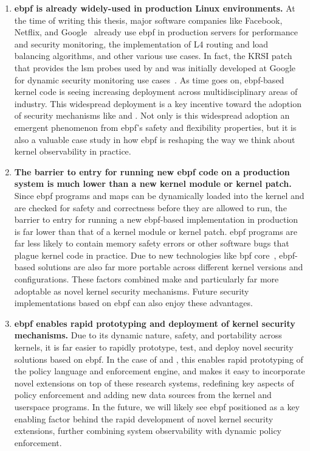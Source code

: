 \begin{enumerate}
  \item \textbf{\gls{ebpf} is already widely-used in production Linux environments.} At
  the time of writing this thesis, major software companies like Facebook, Netflix, and
  Google~\cite{gregg2019_bpf} already use \gls{ebpf} in production servers for performance
  and security monitoring, the implementation of L4 routing and load balancing algorithms,
  and other various use cases. In fact, the KRSI patch that provides the \gls{lsm} probes
  used by \bpfbox{} and \bpfcontain{} was initially developed at Google for dynamic
  security monitoring use cases~\cite{singh2019_krsi}. As time goes on, \gls{ebpf}-based
  kernel code is seeing increasing deployment across multidisciplinary areas of industry.
  This widespread deployment is a key incentive toward the adoption of security mechanisms
  like \bpfbox{} and \bpfcontain{}. Not only is this widespread adoption an emergent
  phenomenon from \gls{ebpf}'s safety and flexibility properties, but it is also
  a valuable case study in how \gls{ebpf} is reshaping the way we think about kernel
  observability in practice.

  \item \textbf{The barrier to entry for running new \gls{ebpf} code on a production
  system is much lower than a new kernel module or kernel patch.}
  Since \gls{ebpf} programs and maps can be dynamically loaded into the kernel and are
  checked for safety and correctness before they are allowed to run, the barrier to entry
  for running a new \gls{ebpf}-based implementation in production is far lower than that
  of a kernel module or kernel patch. \gls{ebpf} programs are far less likely to contain
  memory safety errors or other software bugs that plague kernel code in practice. Due to
  new technologies like \gls{bpf} \gls{core}~\cite{nakryiko2020_core}, \gls{ebpf}-based
  solutions are also far more portable across different kernel versions and
  configurations. These factors combined make \bpfbox{} and particularly \bpfcontain{} far
  more adoptable as novel kernel security mechanisms. Future security implementations
  based on \gls{ebpf} can also enjoy these advantages.

  \item \textbf{\gls{ebpf} enables rapid prototyping and deployment of kernel security mechanisms.}
  Due to its dynamic nature, safety, and portability across kernels, it is far easier to
  rapidly prototype, test, and deploy novel security solutions based on \gls{ebpf}. In the
  case of \bpfbox{} and \bpfcontain{}, this enables rapid prototyping of the policy
  language and enforcement engine, and makes it easy to incorporate novel extensions on
  top of these research systems, redefining key aspects of policy enforcement and adding
  new data sources from the kernel and userspace programs. In the future, we will likely see
  \gls{ebpf} positioned as a key enabling factor behind the rapid development of novel kernel
  security extensions, further combining system observability with dynamic policy enforcement.
\end{enumerate}

